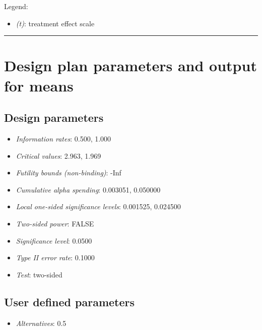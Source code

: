 \documentclass[
  letterpaper,
  DIV=11,
  numbers=noendperiod]{scrreprt}
\providecommand{\tightlist}{%
  \setlength{\itemsep}{0pt}\setlength{\parskip}{0pt}}\usepackage{longtable,booktabs,array}
\begin{document}
Legend:

\begin{itemize}
\tightlist
\item
  \emph{(t)}: treatment effect scale
\end{itemize}

\begin{center}\rule{0.5\linewidth}{0.5pt}\end{center}

\hypertarget{design-plan-parameters-and-output-for-means-2}{%
\section{Design plan parameters and output for
means}\label{design-plan-parameters-and-output-for-means-2}}

\hypertarget{design-parameters-2}{%
\subsection{Design parameters}\label{design-parameters-2}}

\begin{itemize}
\tightlist
\item
  \emph{Information rates}: 0.500, 1.000
\item
  \emph{Critical values}: 2.963, 1.969
\item
  \emph{Futility bounds (non-binding)}: -Inf
\item
  \emph{Cumulative alpha spending}: 0.003051, 0.050000
\item
  \emph{Local one-sided significance levels}: 0.001525, 0.024500
\item
  \emph{Two-sided power}: FALSE
\item
  \emph{Significance level}: 0.0500
\item
  \emph{Type II error rate}: 0.1000
\item
  \emph{Test}: two-sided
\end{itemize}

\hypertarget{user-defined-parameters-3}{%
\subsection{User defined parameters}\label{user-defined-parameters-3}}

\begin{itemize}
\tightlist
\item
  \emph{Alternatives}: 0.5
\end{itemize}
\end{document}
